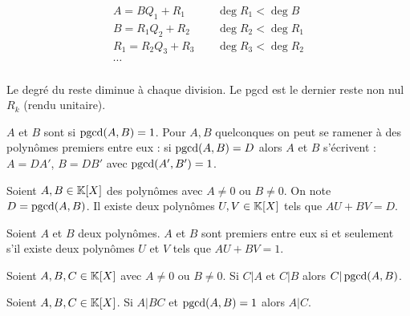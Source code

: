 \documentclass[10pt,class=article,crop=false]{standalone}
\begin{document}
\begin{multicols}{2}
$$\begin{array}{ll}
	A = B Q_1+R_1 \quad \quad & \deg R_1 < \deg B \\
	B = R_1 Q_2 + R_2  & \deg R_2 < \deg R_1 \\
	R_1=R_2Q_3+R_3 & \deg R_3 < \deg R_2 \\
	\cdots & \\
\end{array}$$

Le degré du reste diminue à chaque division.
Le pgcd est le dernier reste non nul $R_k$ (rendu unitaire).


$A$ et $ B$ sont  si $\mathop{\text{pgcd}}(A,B)=1$.
Pour $A,B$ quelconques on peut se ramener à des polynômes premiers entre eux :
si  $\mathop{\text{pgcd}}(A,B)=D$ alors $A$ et $B$ s'écrivent : $A=DA'$, $B=DB'$ avec $\mathop{\text{pgcd}}(A',B')=1$.

\begin{theoreme}[de Bézout]
	\label{thm_Bezout}
	Soient $A, B\in \mathbb{K}[X]$ des polynômes avec $A\neq 0$ ou $B\neq 0$.
	On note $D=\mathop{\text{pgcd}}(A,B)$.
	Il existe deux polynômes $U, V\in \mathbb{K}[X]$ tels que $AU+BV=D$.
\end{theoreme}

\begin{corollaire}
	Soient $A$ et $B$ deux polynômes. $A$ et $B$ sont premiers entre eux si
	et seulement s'il existe deux polynômes $U$ et $V$ tels que $AU+BV=1$.
\end{corollaire}

\begin{corollaire}
	Soient $A, B, C\in \mathbb{K}[X]$ avec $A\neq 0$ ou $B\neq 0$.
	Si $C|A$ et $C|B$ alors $C|\mathop{\text{pgcd}}(A,B)$.
\end{corollaire}

\begin{corollaire}
	Soient $A, B, C\in \mathbb{K}[X]$.
	Si $A|BC$ et $\mathop{\text{pgcd}}(A,B)=1$ alors $A|C$.
\end{corollaire}






\end{multicols}
\end{document}
